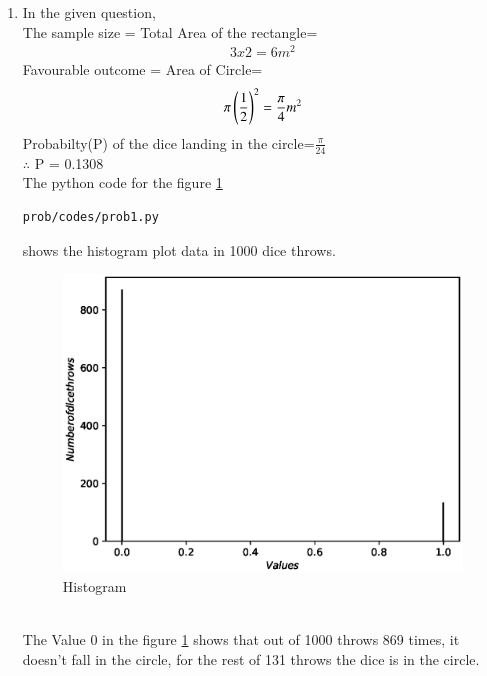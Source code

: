 \renewcommand{\theequation}{\theenumi}
\begin{enumerate}[label=\arabic*.,ref=\thesubsubsection.\theenumi]

\item In the given question,
\\
The sample size = Total Area of the rectangle=
\begin{align}
3x2=6 m^2
\end{align}
Favourable outcome = Area of Circle=
\begin{align}
\pi\left(\frac{1}{2}\right)^2=\frac{\pi}{4} m^2 
\end{align}
Probabilty(P) of the dice landing in the circle=$\frac{\pi}{24}$
\\
$\therefore$ P = 0.1308
\\
The python code for the figure \ref{fig:figure}
\begin{lstlisting}
prob/codes/prob1.py
\end{lstlisting}
shows the histogram plot data in 1000 dice throws.
\begin{figure}[!ht]
\centering
\includegraphics[width=\columnwidth]{./prob/figs/prob1.eps}
\caption{Histogram}
\label{fig:figure}
\end{figure}
\\
The Value 0 in the figure \ref{fig:figure} shows that out of 1000 throws 869 times, it doesn't fall in the circle, for the rest of 131 throws the dice is in the circle.
\end{enumerate}